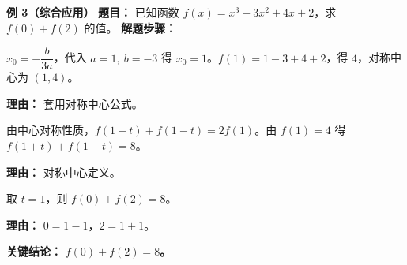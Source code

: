\begin{examplebox}
	\medskip
	\textbf{\textcolor{CExample}{例 3（综合应用）}}
	\textbf{\textcolor{CExample}{题目：}}
	已知函数 $f(x)=x^3-3x^2+4x+2$，求 $f(0)+f(2)$ 的值。
	\textbf{\textcolor{CExample}{解题步骤：}}
	\begin{description}[style=nextline, leftmargin=2.8em, labelsep=0.5em, itemsep=0.45em]
		\item[\textbf{第一步（求对称中心）：}]
			$x_0=-\dfrac{b}{3a}$，代入 $a=1,\ b=-3$ 得 $x_0=1$。$f(1)=1-3+4+2$，得 $4$，对称中心为 $(1,4)$。
			\par\textbf{理由：} 套用对称中心公式。
		\item[\textbf{第二步（写对称关系）：}]
			由中心对称性质，$f(1+t)+f(1-t)=2f(1)$。由 $f(1)=4$ 得 $f(1+t)+f(1-t)=8$。
			\par\textbf{理由：} 对称中心定义。
		\item[\textbf{第三步（代入求值）：}]
			取 $t=1$，则 $f(0)+f(2)=8$。
			\par\textbf{理由：} $0=1-1$，$2=1+1$。
	\end{description}
	\textbf{\textcolor{CExample}{关键结论：}}
	\textbf{$f(0)+f(2)=8$。}
\end{examplebox}
